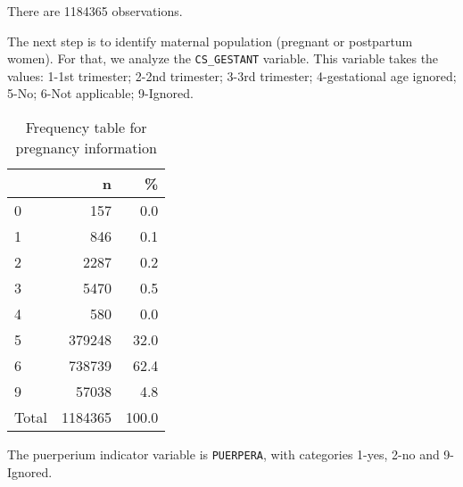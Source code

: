 \documentclass[
]{article}
\newenvironment{Shaded}{\begin{snugshade}}{\end{snugshade}}
\newcommand{\CommentTok}[1]{\textcolor[rgb]{0.56,0.35,0.01}{\textit{#1}}}
\newcommand{\DataTypeTok}[1]{\textcolor[rgb]{0.13,0.29,0.53}{#1}}
\newcommand{\DecValTok}[1]{\textcolor[rgb]{0.00,0.00,0.81}{#1}}
\newcommand{\KeywordTok}[1]{\textcolor[rgb]{0.13,0.29,0.53}{\textbf{#1}}}
\newcommand{\NormalTok}[1]{#1}
\newcommand{\OperatorTok}[1]{\textcolor[rgb]{0.81,0.36,0.00}{\textbf{#1}}}
\newcommand{\OtherTok}[1]{\textcolor[rgb]{0.56,0.35,0.01}{#1}}
\newcommand{\StringTok}[1]{\textcolor[rgb]{0.31,0.60,0.02}{#1}}
\begin{document}
There are 1184365 observations.

The next step is to identify maternal population (pregnant or postpartum
women). For that, we analyze the \texttt{CS\_GESTANT} variable. This
variable takes the values: 1-1st trimester; 2-2nd trimester; 3-3rd
trimester; 4-gestational age ignored; 5-No; 6-Not applicable; 9-Ignored.

\begin{Shaded}
\end{Shaded}

\begin{table}

\caption{\label{tab:unnamed-chunk-10}Frequency table for pregnancy information}
\centering
\begin{tabular}[t]{l|r|r}
\hline
  & n & \%\\
\hline
0 & 157 & 0.0\\
\hline
1 & 846 & 0.1\\
\hline
2 & 2287 & 0.2\\
\hline
3 & 5470 & 0.5\\
\hline
4 & 580 & 0.0\\
\hline
5 & 379248 & 32.0\\
\hline
6 & 738739 & 62.4\\
\hline
9 & 57038 & 4.8\\
\hline
Total & 1184365 & 100.0\\
\hline
\end{tabular}
\end{table}

The puerperium indicator variable is \texttt{PUERPERA}, with categories
1-yes, 2-no and 9-Ignored.

\begin{Shaded}
\end{Shaded}
\end{document}
